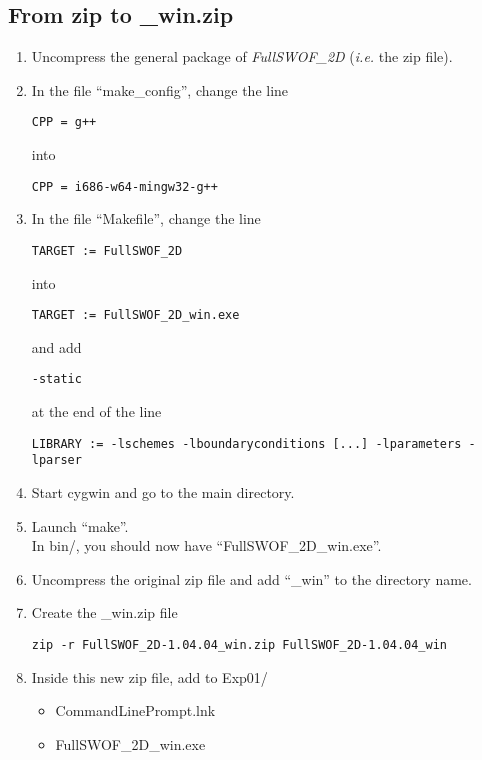 \documentclass[a4paper, 11pt]{article}
\newcommand{\FullSWOFtwoD}{\emph{FullSWOF\_2D}}
\begin{document}
\subsection{From zip to \_win.zip}
\begin{enumerate}
\item Uncompress the general package of \FullSWOFtwoD{} (\emph{i.e.} the zip file).
\item In the file ``make\_config'', change the line
\begin{verbatim}
CPP	= g++
\end{verbatim}
into
\begin{verbatim}
CPP	= i686-w64-mingw32-g++
\end{verbatim}
\item In the file ``Makefile'', change the line
\begin{verbatim}
TARGET := FullSWOF_2D
\end{verbatim}
into
\begin{verbatim}
TARGET := FullSWOF_2D_win.exe
\end{verbatim}
and add
\begin{verbatim}
-static
\end{verbatim}
at the end of the line
\begin{verbatim}
LIBRARY := -lschemes -lboundaryconditions [...] -lparameters -lparser
\end{verbatim}
\item Start cygwin and go to the main directory.
\item Launch ``make''.\\
In bin/, you should now have ``FullSWOF\_2D\_win.exe''.
\item Uncompress the original zip file and add ``\_win'' to the directory name.
\item Create the \_win.zip file
\begin{verbatim}
zip -r FullSWOF_2D-1.04.04_win.zip FullSWOF_2D-1.04.04_win
\end{verbatim}
\item Inside this new zip file, add to Exp01/
	\begin{itemize}
		\item CommandLinePrompt.lnk
		\item FullSWOF\_2D\_win.exe

\end{itemize}
\end{enumerate}
\end{document}

